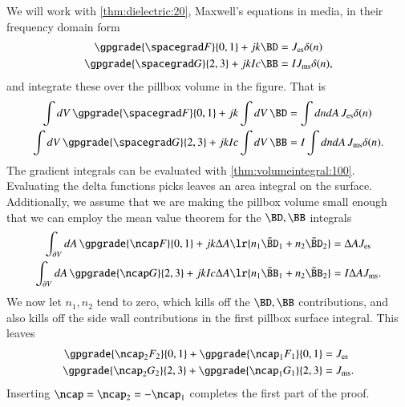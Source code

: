 We will work with \cref{thm:dielectric:20}, Maxwell's equations in media, in their frequency domain form
\begin{dmath}\label{eqn:boundarySurfaceSources:480}
\begin{aligned}
\gpgrade{ \spacegrad F }{0,1} + j k \BD &= J_{\textrm{es}} \delta(n) \\
\gpgrade{ \spacegrad G }{2,3} + j k I c \BB &= I J_{\textrm{ms}} \delta(n),
\end{aligned}
\end{dmath}
and integrate these over the pillbox volume in the figure.  That is
\begin{dmath}\label{eqn:boundarySurfaceSources:500}
\begin{aligned}
\int dV\, \gpgrade{ \spacegrad F }{0,1} + j k \int dV\, \BD &= \int dn dA\, J_{\textrm{es}} \delta(n) \\
\int dV\, \gpgrade{ \spacegrad G }{2,3} + j k I c \int dV\, \BB &= I \int dn dA\, J_{\textrm{ms}} \delta(n).
\end{aligned}
\end{dmath}
The gradient integrals can be evaluated with \cref{thm:volumeintegral:100}.  Evaluating the delta functions picks leaves an area integral on the surface.  Additionally, we assume that we are making the pillbox volume small enough that we can employ the mean value theorem for the \( \BD, \BB \) integrals
\begin{dmath}\label{eqn:boundarySurfaceSources:520}
\begin{aligned}
\int_{\partial V} dA\, \gpgrade{ \ncap F }{0,1} + j k \Delta A \lr{ n_1 \tilde{\BD}_1 + n_2 \tilde{\BD}_2 } &= \Delta A J_{\textrm{es}} \\
\int_{\partial V} dA\, \gpgrade{ \ncap G }{2,3} + j k I c \Delta A \lr{ n_1 \tilde{\BB}_1 + n_2 \tilde{\BB}_2} &= I \Delta A J_{\textrm{ms}}.
\end{aligned}
\end{dmath}
We now let \( n_1, n_2 \) tend to zero, which kills off the \( \BD, \BB \) contributions, and also kills off the side wall contributions in the first pillbox surface integral.  This leaves
\begin{dmath}\label{eqn:boundarySurfaceSources:540}
\begin{aligned}
\gpgrade{ \ncap_2 F_2 }{0,1} + \gpgrade{ \ncap_1 F_1 }{0,1} &= J_{\textrm{es}} \\
\gpgrade{ \ncap_2 G_2 }{2,3} + \gpgrade{ \ncap_1 G_1 }{2,3} &= J_{\textrm{ms}}.
\end{aligned}
\end{dmath}
Inserting \( \ncap = \ncap_2 = -\ncap_1 \) completes the first part of the proof.

